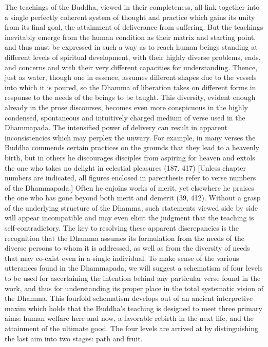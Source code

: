 	The teachings of the Buddha, viewed in their completeness, all link together into a single perfectly coherent system of thought and practice which gains its unity from its final goal, the attainment of deliverance from suffering. But the teachings inevitably emerge from the human condition as their matrix and starting point, and thus must be expressed in such a way as to reach human beings standing at different levels of spiritual development, with their highly diverse problems, ends, and concerns and with their very different capacities for understanding. Thence, just as water, though one in essence, assumes different shapes due to the vessels into which it is poured, so the Dhamma of liberation takes on different forms in response to the needs of the beings to be taught. This diversity, evident enough already in the prose discourses, becomes even more conspicuous in the highly condensed, spontaneous and intuitively charged medium of verse used in the Dhammapada. The intensified power of delivery can result in apparent inconsistencies which may perplex the unwary. For example, in many verses the Buddha commends certain practices on the grounds that they lead to a heavenly birth, but in others he discourages disciples from aspiring for heaven and extols the one who takes no delight in celestial pleasures (187, 417) [Unless chapter numbers are indicated, all figures enclosed in parenthesis refer to verse numbers of the Dhammapada.]
	Often he enjoins works of merit, yet elsewhere he praises the one who has gone beyond both merit and demerit (39, 412). Without a grasp of the underlying structure of the Dhamma, such statements viewed side by side will appear incompatible and may even elicit the judgment that the teaching is self-contradictory.
	The key to resolving these apparent discrepancies is the recognition that the Dhamma assumes its formulation from the needs of the diverse persons to whom it is addressed, as well as from the diversity of needs that may co-exist even in a single individual. To make sense of the various utterances found in the Dhammapada, we will suggest a schematism of four levels to be used for ascertaining the intention behind any particular verse found in the work, and thus for understanding its proper place in the total systematic vision of the Dhamma. This fourfold schematism develops out of an ancient interpretive maxim which holds that the Buddha's teaching is designed to meet three primary aims: human welfare here and now, a favorable rebirth in the next life, and the attainment of the ultimate good. The four levels are arrived at by distinguishing the last aim into two stages: path and fruit.
